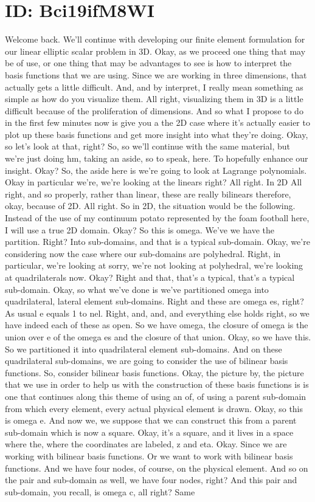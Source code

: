 \documentclass[10pt]{article}
\begin{document}
\section*{ID: Bci19ifM8WI}
Welcome back. We'll continue with developing our finite element formulation for our linear elliptic scalar problem in 3D. Okay, as we proceed one thing that may be of use, or one thing that may be advantages to see is how to interpret the basis functions that we are using. Since we are working in three dimensions, that actually gets a little difficult. And, and by interpret, I really mean something as simple as how do you visualize them. All right, visualizing them in 3D is a little difficult because of the proliferation of dimensions. And so what I propose to do in the first few minutes now is give you a the 2D case where it's actually easier to plot up these basis functions and get more insight into what they're doing. Okay, so let's look at that, right? So, so we'll continue with the same material, but we're just doing hm, taking an aside, so to speak, here. To hopefully enhance our insight. Okay? So, the aside here is we're going to look at Lagrange polynomials. Okay in particular we're, we're looking at the linears right? All right. In 2D All right, and so properly, rather than linear, these are really bilinears therefore, okay, because of 2D. All right. So in 2D, the situation would be the following. Instead of the use of my continuum potato represented by the foam football here, I will use a true 2D domain. Okay? So this is omega. We've we have the partition. Right? Into sub-domains, and that is a typical sub-domain. Okay, we're considering now the case where our sub-domains are polyhedral. Right, in particular, we're looking at sorry, we're not looking at polyhedral, we're looking at quadrilaterals now. Okay? Right and that, that's a typical, that's a typical sub-domain. Okay, so what we've done is we've partitioned omega into quadrilateral, lateral element sub-domains. Right and these are omega es, right? As usual e equals 1 to nel. Right, and, and, and everything else holds right, so we have indeed each of these as open. So we have omega, the closure of omega is the union over e of the omega es and the closure of that union. Okay, so we have this. So we partitioned it into quadrilateral element sub-domains. And on these quadrilateral sub-domains, we are going to consider the use of bilinear basis functions. So, consider bilinear basis functions. Okay, the picture by, the picture that we use in order to help us with the construction of these basis functions is is one that continues along this theme of using an of, of using a parent sub-domain from which every element, every actual physical element is drawn. Okay, so this is omega e. And now we, we suppose that we can construct this from a parent sub-domain which is now a square. Okay, it's a square, and it lives in a space where the, where the coordinates are labeled, z and eta. Okay. Since we are working with bilinear basis functions. Or we want to work with bilinear basis functions. And we have four nodes, of course, on the physical element. And so on the pair and sub-domain as well, we have four nodes, right? And this pair and sub-domain, you recall, is omega c, all right? Same 
\end{document}
